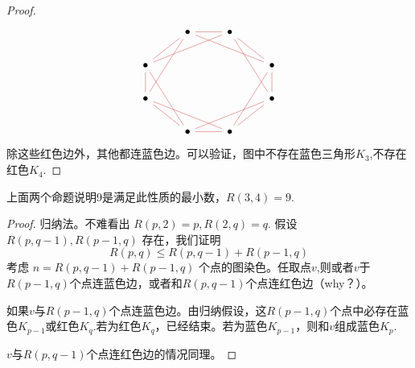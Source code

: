 \documentclass[oneside]{book}
\begin{document}
\begin{proof}
    \[\begin{tikzcd}
        & \bullet & \bullet \\
        \bullet &&& \bullet \\
        \bullet &&& \bullet \\
        & \bullet & \bullet
        \arrow[color={rgb,255:red,214;green,92;blue,92}, no head, from=1-2, to=1-3]
        \arrow[color={rgb,255:red,214;green,92;blue,92}, no head, from=1-2, to=2-1]
        \arrow[color={rgb,255:red,214;green,92;blue,92}, no head, from=1-2, to=2-4]
        \arrow[color={rgb,255:red,214;green,92;blue,92}, no head, from=1-2, to=3-1]
        \arrow[color={rgb,255:red,214;green,92;blue,92}, no head, from=1-3, to=2-4]
        \arrow[color={rgb,255:red,214;green,92;blue,92}, no head, from=1-3, to=3-4]
        \arrow[color={rgb,255:red,214;green,92;blue,92}, no head, from=2-1, to=1-3]
        \arrow[color={rgb,255:red,214;green,92;blue,92}, no head, from=2-1, to=3-1]
        \arrow[color={rgb,255:red,214;green,92;blue,92}, no head, from=2-1, to=4-2]
        \arrow[color={rgb,255:red,214;green,92;blue,92}, no head, from=2-4, to=3-4]
        \arrow[color={rgb,255:red,214;green,92;blue,92}, no head, from=2-4, to=4-3]
        \arrow[color={rgb,255:red,214;green,92;blue,92}, no head, from=3-1, to=4-2]
        \arrow[color={rgb,255:red,214;green,92;blue,92}, no head, from=3-4, to=4-2]
        \arrow[color={rgb,255:red,214;green,92;blue,92}, no head, from=4-2, to=4-3]
        \arrow[color={rgb,255:red,214;green,92;blue,92}, no head, from=4-3, to=3-1]
        \arrow[color={rgb,255:red,214;green,92;blue,92}, no head, from=4-3, to=3-4]
    \end{tikzcd}\]
    除这些红色边外，其他都连蓝色边。可以验证，图中不存在蓝色三角形$K_3$,不存在红色$K_4$.
\end{proof}

上面两个命题说明9是满足此性质的最小数，$R(3,4) = 9$.

\begin{proof}
    归纳法。不难看出 $R(p,2) = p, R(2, q) = q$.
    假设 $R(p, q-1), R(p-1,q)$ 存在，我们证明
    \[R(p,q) \le R(p,q-1) + R(p-1, q)\]
    考虑 $n = R(p,q-1) + R(p-1, q)$ 个点的图染色。任取点$v$,则或者$v$于$R(p-1,q)$个点连蓝色边，或者和$R(p,q-1)$个点连红色边（why？）。
    
    如果$v$与$R(p-1,q)$个点连蓝色边。由归纳假设，这$R(p-1,q)$个点中必存在蓝色$K_{p-1}$或红色$K_q$.若为红色$K_q$，已经结束。若为蓝色$K_{p-1}$，则和$v$组成蓝色$K_p$.

    $v$与$R(p,q-1)$个点连红色边的情况同理。
\end{proof}


\end{document}
